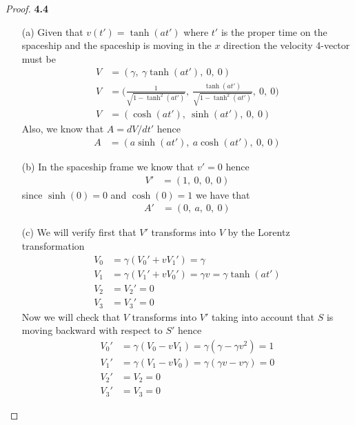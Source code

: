 \documentclass[11pt]{article}
\theoremstyle{definition}
\begin{document}
\begin{proof}{\textbf{4.4}}
\begin{itemize}
    \item [(a)] Given that $v(t') = \tanh(at')$ where $t'$ is the proper time
    on the spaceship and the spaceship is moving in the $x$ direction the
    velocity 4-vector must be
    \begin{align*}
        V &= (\gamma,~\gamma\tanh(at'),~0,~0)\\
        V &= \Bigg(
            \frac{1}{\sqrt{1 - \tanh^2(at')}},~
            \frac{\tanh(at')}{\sqrt{1 - \tanh^2(at')}},~
            0,~
            0
        \Bigg)\\
        V &= (\cosh(at'),~\sinh(at'),~0,~0)
    \end{align*}
    Also, we know that $A = dV/dt'$ hence
    \begin{align*}
        A &= (a\sinh(at'),~a\cosh(at'),~0,~0)
    \end{align*}
    \item [(b)] In the spaceship frame we know that $v' = 0$ hence
    \begin{align*}
        V' &= (1,~0,~0,~0)
    \end{align*}
    since $\sinh(0) = 0$ and $\cosh(0) = 1$ we have that
    \begin{align*}
        A' &= (0,~a,~0,~0)
    \end{align*}
    \item [(c)] We will verify first that $V'$ transforms into $V$ by the
    Lorentz transformation
    \begin{align*}
        V_0 &= \gamma(V_0' + vV_1') = \gamma\\
        V_1 &= \gamma(V_1' + vV_0') = \gamma v = \gamma \tanh(at')\\
        V_2 &= V_2' = 0\\
        V_3 &= V_3' = 0
    \end{align*}
    Now we will check that $V$ transforms into $V'$ taking into account that
    $S$ is moving backward with respect to $S'$ hence
    \begin{align*}
        V_0' &= \gamma(V_0 - vV_1) = \gamma(\gamma - \gamma v^2) = 1\\
        V_1' &= \gamma(V_1 - vV_0) = \gamma(\gamma v - v\gamma) = 0\\
        V_2' &= V_2 = 0\\
        V_3' &= V_3 = 0
    \end{align*}


\end{itemize}
\end{proof}
\end{document}
